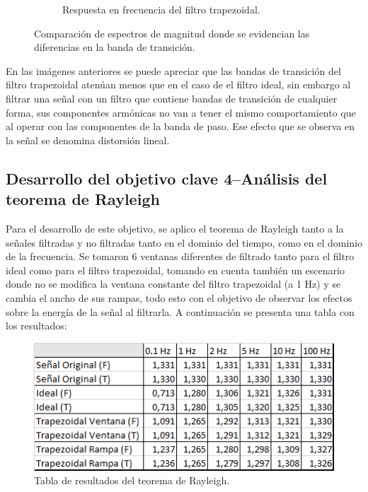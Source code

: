 \begin{figure}[H]
\begin{subfigure}[b]{0.48\linewidth}
		\caption{\scriptsize Respuesta en frecuencia del filtro trapezoidal.}
		\label{subfig:frecuenciaTrapezoidal}
	\end{subfigure}
	\vspace{-3mm}
	\caption{\scriptsize Comparación de espectros de magnitud donde se evidencian las diferencias en la banda de transición.}
	\label{fig:comparacion}
	\vspace{-5mm}
\end{figure}

En las imágenes anteriores se puede apreciar que las bandas de transición del filtro trapezoidal atenúan menos que en el caso de el filtro ideal, sin embargo al filtrar una señal con un filtro que contiene bandas de transición de cualquier forma, sus componentes armónicas no van a tener el mismo comportamiento que al operar con las componentes de la banda de paso. Ese efecto que se observa en la señal se denomina distorsión lineal.

\subsection{Desarrollo del objetivo clave 4--Análisis del teorema de Rayleigh}
Para el desarrollo de este objetivo, se aplico el teorema de Rayleigh tanto a la señales filtradas y no filtradas tanto en el dominio del tiempo, como en el dominio de la frecuencia. Se tomaron 6 ventanas diferentes de filtrado tanto para el filtro ideal como para el filtro trapezoidal, tomando en cuenta también un escenario donde no se modifica la ventana constante del filtro trapezoidal (a 1 Hz) y se cambia el ancho de sus rampas, todo esto con el objetivo de observar los efectos sobre la energía de la señal al filtrarla. A continuación se presenta una tabla con los resultados:

\begin{figure}[H]
	\centering
	\includegraphics[width=0.7\linewidth]{img/Rayleigh}
	\vspace{-3mm}
	\caption{\scriptsize Tabla de resultados del teorema de Rayleigh.}
	\label{fig:Rayleigh}
	\vspace{-5mm}
\end{figure}

